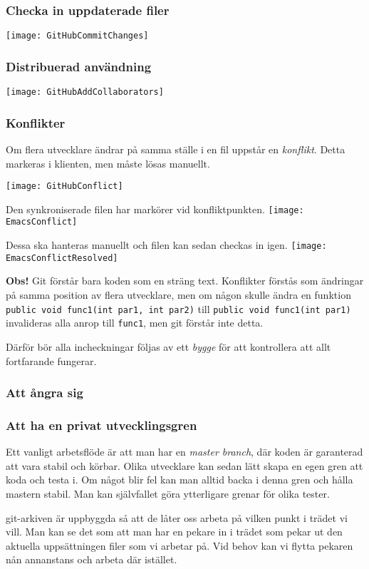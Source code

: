 \documentclass[swedish]{beamer}
\begin{document}
\begin{frame}[fragile]
\frametitle{Checka in uppdaterade filer}
\texttt{[image: GitHubCommitChanges]}
\end{frame}

\begin{frame}[fragile]
\frametitle{Distribuerad användning}
\texttt{[image: GitHubAddCollaborators]}
\end{frame}

\begin{frame}
\frametitle{Konflikter}
Om flera utvecklare ändrar på samma ställe i en fil uppstår en
\emph{konflikt}.  Detta markeras i klienten, men måste lösas manuellt.
\end{frame}

\begin{frame}[fragile]
\texttt{[image: GitHubConflict]}
\end{frame}

\begin{frame}
Den synkroniserade filen har markörer vid konfliktpunkten.
\texttt{[image: EmacsConflict]}
\end{frame}


\begin{frame}
Dessa ska hanteras manuellt och filen kan sedan checkas in igen.
\texttt{[image: EmacsConflictResolved]}
\end{frame}

\begin{frame}[fragile]
\textbf{Obs!}
Git förstår bara koden som en sträng text.
Konflikter förstås som ändringar på samma position av flera utvecklare, men om någon skulle ändra
en funktion \lstinline+public void func1(int par1, int par2)+ till \lstinline+public void func1(int par1)+ invalideras alla anrop till \lstinline+func1+, men
git förstår inte detta.

Därför bör alla incheckningar följas av ett \emph{bygge} för att
kontrollera att allt fortfarande fungerar.
\end{frame}

\begin{frame}
  \frametitle{Att ångra sig}
  
\end{frame}

\begin{frame}[fragile]
\frametitle{Att ha en privat utvecklingsgren}
Ett vanligt arbetsflöde är att man har en \emph{master branch}, där koden är garanterad att vara stabil och körbar.  Olika utvecklare kan sedan lätt skapa en egen gren att koda och testa i.  Om något blir fel kan man alltid backa i denna gren och hålla mastern stabil.  Man kan självfallet göra ytterligare grenar för olika tester.

git-arkiven är uppbyggda så att de låter oss arbeta på vilken punkt i trädet vi vill.  Man kan se det som att man har en pekare in i trädet som pekar ut den aktuella uppsättningen filer som vi arbetar på.  Vid behov kan vi flytta pekaren nån annanstans och arbeta där istället.
\end{frame}
\end{document}
